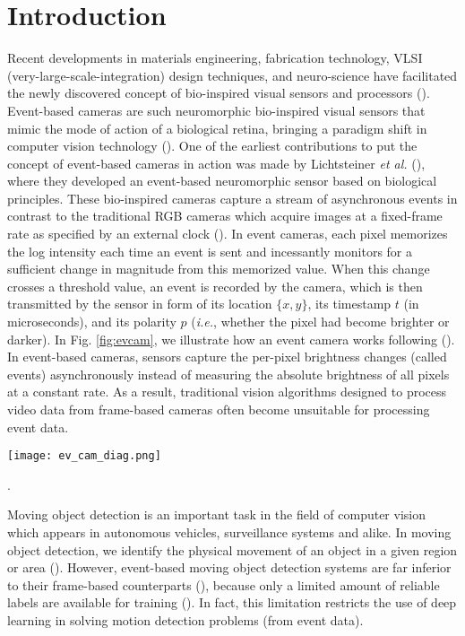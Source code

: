 \documentclass{article}
\begin{document}
\section{Introduction}
Recent developments in materials engineering, fabrication technology, VLSI (very-large-scale-integration) design techniques, and neuro-science have facilitated the newly discovered concept of bio-inspired visual sensors and processors (\cite{chen2020event}). Event-based cameras are such neuromorphic bio-inspired visual sensors that mimic the mode of action of a biological retina, bringing a paradigm shift in computer vision technology (\cite{chen2020event}). One of the earliest contributions to put the concept of event-based cameras in action was made by Lichtsteiner \textit{et al.} (\cite{lichtsteiner2006128}), where they  developed an event-based neuromorphic sensor based on biological principles. These bio-inspired cameras capture a stream of asynchronous events in contrast to the traditional RGB cameras which acquire images at a fixed-frame rate as specified by an external clock (\cite{gallego2020event}). In event cameras, each pixel memorizes the log intensity each time an event is sent and incessantly monitors for a sufficient change in magnitude from this memorized value. When this change crosses a threshold value, an event is recorded by the camera, which is then transmitted by the sensor in form of its location $\{x,y\}$, its timestamp $t$ (in microseconds), and its polarity $p$ (\textit{i.e.}, whether the pixel had become brighter or darker). In Fig. \ref{fig:evcam}, we illustrate how an event camera works following (\cite{gallego2020event}). In event-based cameras,  sensors capture the per-pixel brightness changes (called events) asynchronously instead of measuring the absolute brightness of all pixels at a constant rate. As a result, traditional vision algorithms designed to process video data from frame-based cameras often become unsuitable for processing event data. 

\begin{figure*}
\begin{center}
\texttt{[image: ev\_cam\_diag.png]}
\end{center}
   \caption{Visualization of the output from a neuromorphic vision sensor and a standard frame-based camera when facing a rotating disk with a black dot. Inspired by \cite{gallego2020event}}.
    \label{fig:evcam}
\label{fig:evcam}
\end{figure*}

Moving object detection is an important task in the field of computer vision which appears in autonomous vehicles, surveillance systems and alike. In moving object detection, we identify the physical movement of an object in a given region or area (\cite{kulchandani2015moving}). However, event-based moving object detection systems are far inferior to their frame-based counterparts (\cite{piccardi2004background,agarwal2016review}), because only a limited amount of reliable labels are available for training (\cite{bi2020graph}). In fact, this limitation restricts the use of deep learning in solving motion detection problems (from event data).   
\end{document}
